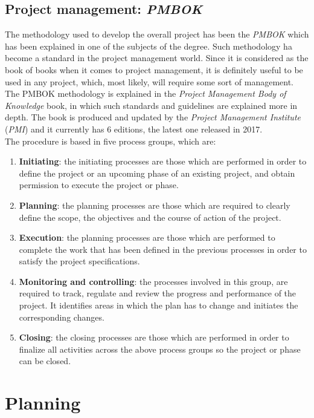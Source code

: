 \documentclass[a4paper, 12pt, oneside]{book}
\begin{document}
\section{Project management: \emph{PMBOK}}
The methodology used to develop the overall project has been the \emph{PMBOK} which has been explained in one of the subjects of the degree. Such methodology ha become a standard in the project management world. Since it is considered as the book of books when it comes to project management, it is definitely useful to be used in any project, which, most likely, will require some sort of management.
\\[8pt]
The PMBOK methodology is explained in the \emph{Project Management Body of Knowledge} book, in which such standards and guidelines are explained more in depth. The book is produced and updated by the \emph{Project Management Institute} (\emph{PMI}) and it currently has 6 editions, the latest one released in 2017.
\\[8pt]
The procedure is based in five process groups, which are:
\begin{enumerate}[label = \arabic{*}.]
	\item \textbf{Initiating}: the initiating processes are those which are performed in order to define the project or an upcoming phase of an existing project, and obtain permission to execute the project or phase.
	\item \textbf{Planning}: the planning processes are those which are required to clearly define the scope, the objectives and the course of action of the project.
	\item \textbf{Execution}: the planning processes are those which are performed to complete the work that has been defined in the previous processes in order to satisfy the project specifications.
	\item \textbf{Monitoring and controlling}: the processes involved in this group, are required to track, regulate and review the progress and performance of the project. It identifies areas in which the plan has to change and initiates the corresponding changes.
	\item \textbf{Closing}: the closing processes are those which are performed in order to finalize all activities across the above process groups so the project or phase can be closed.
\end{enumerate}
\chapter{Planning}
\end{document}
